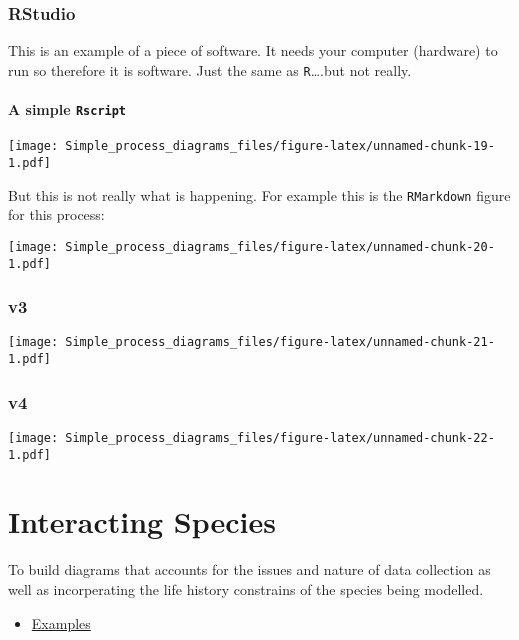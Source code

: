 \documentclass[]{book}
\providecommand{\tightlist}{%
  \setlength{\itemsep}{0pt}\setlength{\parskip}{0pt}}
\begin{document}
\hypertarget{rstudio-1}{%
\subsection{RStudio}\label{rstudio-1}}

This is an example of a piece of software. It needs your computer (hardware) to run so therefore it is software. Just the same as \texttt{R}\ldots.but not really.

\hypertarget{a-simple-rscript}{%
\subsubsection{\texorpdfstring{A simple \texttt{Rscript}}{A simple Rscript}}\label{a-simple-rscript}}

\texttt{[image: Simple\_process\_diagrams\_files/figure-latex/unnamed-chunk-19-1.pdf]}

But this is not really what is happening. For example this is the \texttt{RMarkdown} figure for this process:

\texttt{[image: Simple\_process\_diagrams\_files/figure-latex/unnamed-chunk-20-1.pdf]}

\hypertarget{v3}{%
\subsection{v3}\label{v3}}

\texttt{[image: Simple\_process\_diagrams\_files/figure-latex/unnamed-chunk-21-1.pdf]}

\hypertarget{v4}{%
\subsection{v4}\label{v4}}

\texttt{[image: Simple\_process\_diagrams\_files/figure-latex/unnamed-chunk-22-1.pdf]}

\hypertarget{sppPro}{%
\chapter{Interacting Species}\label{sppPro}}

To build diagrams that accounts for the issues and nature of data collection as well as incorperating the life history constrains of the species being modelled.

\begin{itemize}
\tightlist
\item
  \protect\hyperlink{exams}{Examples}
\end{itemize}
\end{document}

